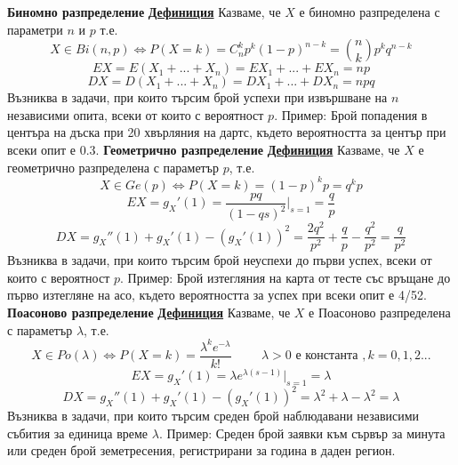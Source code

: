 \documentclass{article}
\begin{document}
\textbf{Биномно разпределение} \newline\newline
\textbf{\underline{Дефиниция}}
Казваме, че $X$ е биномно разпределена с параметри $n$ и $p$ т.е. $$X \in Bi(n, p) \iff P(X = k) = C_{n}^kp^k(1 - p)^{n-k} =
\binom{n}{k}p^kq^{n-k}$$
$$EX = E(X_1 + ... + X_n) = EX_1 + ... + EX_n = np$$
$$DX = D(X_1 + ... + X_n) = DX_1 + ... + DX_n = npq$$
Възниква в задачи, при които търсим брой успехи при извършване на $n$ независими опита, всеки от които с вероятност $p$. \newline\newline
Пример: Брой попадения в центъра на дъска при 20 хвърляния на дартс, където вероятността за център при всеки опит е 0.3. \newline\newline
\textbf{Геометрично разпределение} \newline\newline
\textbf{\underline{Дефиниция}}
Казваме, че $X$ е геометрично разпределена с параметър $p$, т.е. $$X \in Ge(p) \iff P(X = k) = (1 - p)^{k}p = q^{k}p$$
$$EX = g_X'(1) = \frac{pq}{(1 - qs)^2}\vert_{s=1} = \frac{q}{p}$$
$$DX = g_X''(1) + g_X'(1) - (g_X'(1))^2 = \frac{2q^2}{p^2} + \frac{q}{p} - \frac{q^2}{p^2} = \frac{q}{p^2}$$
Възниква в задачи, при които търсим брой неуспехи до първи успех, всеки от които с вероятност $p$. \newline\newline
Пример: Брой изтегляния на карта от тесте със връщане до първо изтегляне на асо, където вероятността за успех при всеки опит е 4/52. \newline\newline
\textbf{Поасоново разпределение} \newline\newline
\textbf{\underline{Дефиниция}}
Казваме, че $X$ е Поасоново разпределена с параметър $\lambda$, т.е. $$X \in Po(\lambda) \iff P(X = k) =
\frac{\lambda^ke^{-\lambda}}{k!} \hspace{1cm} \lambda > 0 \text{ е константа }, k = 0,1,2...$$
$$EX = g_X'(1) = \lambda e^{\lambda(s-1)}\vert_{s=1} = \lambda$$
$$DX = g_X''(1) + g_X'(1) - (g_X'(1))^2 = \lambda^2 + \lambda - \lambda^2 = \lambda$$
Възниква в задачи, при които търсим среден брой наблюдавани независими събития за единица време $\lambda$. \newline\newline
Пример: Среден брой заявки към сървър за минута или среден брой земетресения, регистрирани за година в даден регион.
\end{document}
